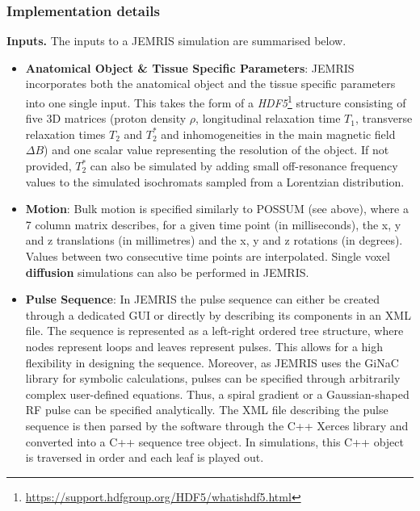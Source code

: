 \hfill

\subsubsection{Implementation details}

\textbf{Inputs.} The inputs to a JEMRIS simulation are summarised below.

\begin{itemize}
    
    \item \textbf{Anatomical Object \& Tissue Specific Parameters}: JEMRIS incorporates both the anatomical object and the tissue specific parameters into one single input.
    This takes the form of a \textit{HDF5}\footnote{\url{https://support.hdfgroup.org/HDF5/whatishdf5.html}} structure consisting of five 3D matrices (proton density $\rho$, longitudinal relaxation time $T_1$, transverse relaxation times $T_2$ and $T_2^*$ and inhomogeneities in the main magnetic field $\Delta B$) and one scalar value representing the resolution of the object.
    If not provided, $T_2^*$ can also be simulated by adding small off-resonance frequency values to the simulated isochromats sampled from a Lorentzian distribution. 

    \item \textbf{Motion}: Bulk motion is specified similarly to POSSUM (see above), where a 7 column matrix describes, for a given time point (in milliseconds), the x, y and z translations (in millimetres) and the x, y and z rotations (in degrees). 
    Values between two consecutive time points are interpolated. 
    Single voxel \textbf{diffusion} simulations can also be performed in JEMRIS. 
    
    \item \textbf{Pulse Sequence}: In JEMRIS the pulse sequence can either be created through a dedicated GUI or directly by describing its components in an XML file.
    The sequence is represented as a left-right ordered tree structure, where nodes represent loops and leaves represent pulses.
    This allows for a high flexibility in designing the sequence.
    Moreover, as JEMRIS uses the GiNaC library for symbolic calculations, pulses can be specified through arbitrarily complex user-defined equations.
    Thus, a spiral gradient or a Gaussian-shaped RF pulse can be specified analytically.
    The XML file describing the pulse sequence is then parsed by the software through the C++ Xerces library and converted into a C++ sequence tree object.
    In simulations, this C++ object is traversed in order and each leaf is played out.
    

\end{itemize}
